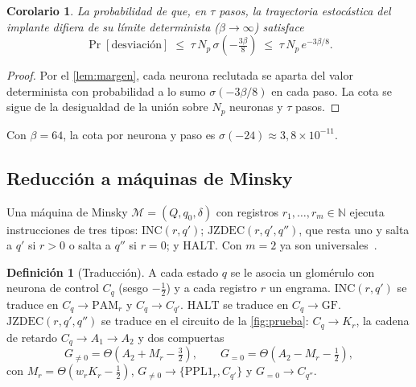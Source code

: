 \documentclass[11pt,a4paper]{article}
\theoremstyle{plain}
\newtheorem{corolario}{Corolario}
\theoremstyle{definition}
\newtheorem{definicion}{Definición}
\theoremstyle{remark}
\newcommand{\PAM}{\mathrm{PAM}}
\newcommand{\PPL}{\mathrm{PPL1}}
\newcommand{\GF}{\mathrm{GF}}
\newcommand{\sig}{\sigma}
\newcommand{\N}{\mathbb{N}}
\begin{document}
\begin{corolario}
\label{cor:error}
La probabilidad de que, en $\tau$ pasos, la trayectoria estocástica del
implante difiera de su límite determinista ($\beta\to\infty$) satisface
\begin{equation}
  \Pr[\text{desviación}] \;\le\; \tau\, N_p\, \sig\!\left(-\tfrac{3\beta}{8}\right)
  \;\le\; \tau\, N_p\, e^{-3\beta/8}.
\end{equation}
\end{corolario}
\begin{proof}
Por el \cref{lem:margen}, cada neurona reclutada se aparta del valor
determinista con probabilidad a lo sumo $\sig(-3\beta/8)$ en cada paso. La
cota se sigue de la desigualdad de la unión sobre $N_p$ neuronas y $\tau$ pasos.
\end{proof}

Con $\beta=64$, la cota por neurona y paso es $\sig(-24)\approx3{,}8\times10^{-11}$.

\subsection{Reducción a máquinas de Minsky}

Una máquina de Minsky $\mathcal M=(Q,q_0,\delta)$ con registros
$r_1,\dots,r_m\in\N$ ejecuta instrucciones de tres tipos:
$\mathrm{INC}(r,q')$; $\mathrm{JZDEC}(r,q',q'')$, que resta uno y salta a
$q'$ si $r>0$ o salta a $q''$ si $r=0$; y $\mathrm{HALT}$. Con $m=2$ ya son
universales~\cite{minsky1967}.

\begin{definicion}[Traducción]
\label{def:traduccion}
A cada estado $q$ se le asocia un glomérulo con neurona de control $C_q$
(sesgo $-\tfrac12$) y a cada registro $r$ un engrama. $\mathrm{INC}(r,q')$ se
traduce en $C_q\to\PAM_r$ y $C_q\to C_{q'}$. $\mathrm{HALT}$ se traduce en
$C_q\to\GF$. $\mathrm{JZDEC}(r,q',q'')$ se traduce en el circuito de la
\cref{fig:prueba}: $C_q\to K_r$, la cadena de retardo $C_q\to A_1\to A_2$ y
dos compuertas
\begin{equation}
  G_{\neq0}=\Theta\!\left(A_2+M_r-\tfrac32\right),\qquad
  G_{=0}=\Theta\!\left(A_2-M_r-\tfrac12\right),
\end{equation}
con $M_r=\Theta\!\left(w_r K_r-\tfrac12\right)$, $G_{\neq0}\to\{\PPL_r,C_{q'}\}$
y $G_{=0}\to C_{q''}$.
\end{definicion}
\end{document}
